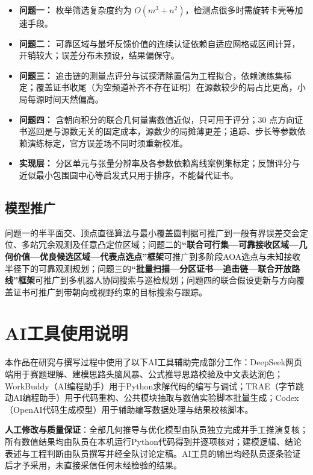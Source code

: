 \documentclass[withoutpreface]{cumcmthesis}
\begin{document}
\begin{itemize}
\item \textbf{问题一：} 枚举筛选复杂度约为 $O(m^3+n^2)$，检测点很多时需旋转卡壳等加速手段。
\item \textbf{问题二：} 可靠区域与最坏反馈价值的连续认证依赖自适应网格或区间计算，开销较大；误差分布未预设，结果偏保守。
\item \textbf{问题三：} 追击链的测量点评分与试探清除置信为工程拟合，依赖演练集标定；覆盖证书收尾（为空频道补齐不存在证明）在源数较少的局占比更高，小局每源时间天然偏高。
\item \textbf{问题四：} 含朝向积分的联合几何量需数值近似，只可用于评分；$30$ 点方向证书巡回是与源数无关的固定成本，源数少的局摊薄更差；追踪、步长等参数依赖演练标定，官方误差场不同时须重新校准。
\item \textbf{实现层：} 分区单元与张量分辨率及各参数依赖离线案例集标定；反馈评分与近似最小包围圆中心等启发式只用于排序，不能替代证书。
\end{itemize}

\subsection{模型推广}

问题一的半平面交、顶点直径算法与最小覆盖圆判据可推广到一般有界误差交会定位、多站冗余观测及任意凸定位区域；问题二的\textbf{“联合可行集—可靠接收区域—几何价值—优良候选区域—代表点选点”框架}可推广到多阶段AOA选点与未知接收半径下的可靠观测规划；问题三的\textbf{“批量扫描—分区证书—追击链—联合开放路线”框架}可推广到多机器人协同搜索与巡检规划；问题四的联合假设更新与方向覆盖证书可推广到带朝向或视野约束的目标搜索与跟踪。

\section{AI工具使用说明}

本作品在研究与撰写过程中使用了以下AI工具辅助完成部分工作：DeepSeek网页端用于赛题理解、建模思路头脑风暴、公式推导思路校验及中文表达润色；WorkBuddy（AI编程助手）用于Python求解代码的编写与调试；TRAE（字节跳动AI编程助手）用于代码重构、公共模块抽取与数值实验脚本批量生成；Codex（OpenAI代码生成模型）用于辅助编写数据处理与结果校核脚本。

\textbf{人工修改与质量保证}：全部几何推导与优化模型由队员独立完成并手工推演复核；所有数值结果均由队员在本机运行Python代码得到并逐项核对；建模逻辑、结论表述与工程判断由队员撰写并经全队讨论定稿。AI工具的输出均经队员逐条验证后才予采用，未直接采信任何未经检验的结果。
\end{document}
